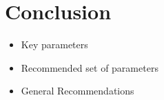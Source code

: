 \documentclass[11pt, a4paper]{article}
\theoremstyle{definition}
\begin{document}
\section{Conclusion}
	\begin{itemize}
		\item Key parameters
		\item Recommended set of parameters
		\item General Recommendations
	\end{itemize}
	












\begin{comment}
	\end{multicols*}
	\end{landscape}
\end{comment}
\end{document}
